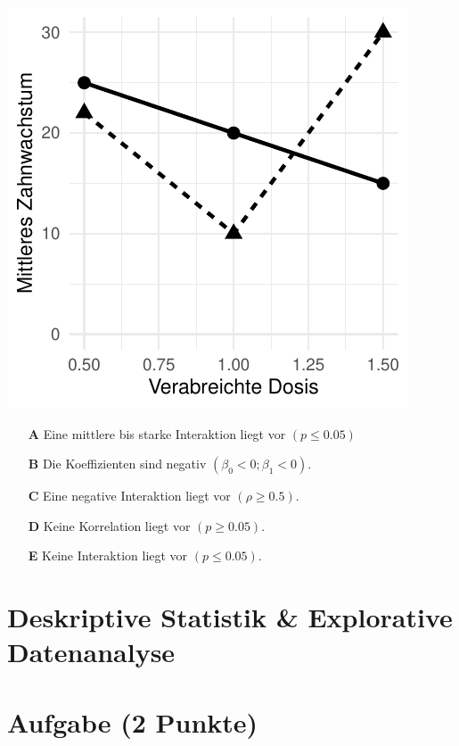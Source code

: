 \documentclass[a4paper, 9pt]{scrartcl}\usepackage[]{graphicx}\usepackage[]{xcolor}
\makeatletter
\def\maxwidth{ %
  \ifdim\Gin@nat@width>\linewidth
    \linewidth
  \else
    \Gin@nat@width
  \fi
}
\makeatother
\begin{document}
{\centering \includegraphics[width=\maxwidth]{img/mc-anova-02-a-1} 

}







\begin{enumerate}
\item [\textbf{A} \msquare] Eine mittlere bis starke Interaktion liegt vor $(p \leq 0.05)$
\item [\textbf{B} \msquare] Die Koeffizienten sind negativ $(\beta_0 < 0; \beta_1 < 0)$.
\item [\textbf{C} \msquare] Eine negative Interaktion liegt vor $(\rho \geq 0.5)$.
\item [\textbf{D} \msquare] Keine Korrelation liegt vor $(p \geq 0.05)$.
\item [\textbf{E} \msquare] Keine Interaktion liegt vor $(p \leq 0.05)$.
\end{enumerate} 
\section*{Deskriptive Statistik \& Explorative Datenanalyse}

\section{Aufgabe \hfill (2 Punkte)}
\end{document}

